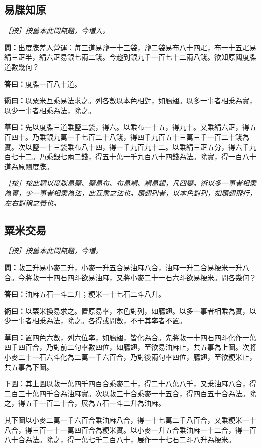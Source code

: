 \documentclass[11pt,a4paper]{article}
\newcommand{\Question}[1]{\par\noindent\textbf{\color{problemcolor}問：}#1\par}
\newcommand{\Answer}[1]{\par\noindent\textbf{\color{answercolor}答曰：}#1\par}
\newcommand{\Method}[1]{\par\noindent\textbf{\color{methodcolor}術曰：}#1\par}
\newcommand{\Working}[1]{\par\noindent\textbf{草曰：}#1\par}
\newcommand{\EditorialNote}[1]{\par\noindent\textit{［按］#1}\par}
\begin{document}
\subsection*{\color{sectioncolor}易牒知原}

\EditorialNote{按舊本此問無題，今増入。}

\Question{出度牒差人營運：毎三道易鹽一十三袋，鹽二袋易布八十四疋，布一十五疋易絹三疋半，絹六疋易銀七兩二錢。今趂到銀九千一百七十二兩八錢。欲知原闗度牒道數幾何？}

\Answer{度牒一百八十道。}

\Method{以粟米互乘易法求之。列各數以本色相對，如鴈翅。以多一事者相乗為實，以少一事者相乘為法，除之。}

\Working{先以度牒三道乗鹽二袋，得六。以乘布一十五，得九十。又乗絹六疋，得五百四十。乃乗銀九萬一千七百二十八錢，得四千九百五十三萬三千一百二十錢為實。次以鹽一十三袋乗布八十四，得一千九百九十二。以乗絹三疋五分，得六千九百七十二。乃乘銀七兩二錢，得五十萬一千九百八十四錢為法。除實，得一百八十道為原闗度牒。}

\EditorialNote{按此題以度牒易鹽、鹽易布、布易絹、絹易銀，凡四變。術以多一事者相乗為實，少一事者相乗為法，此互乘之法也。鴈翅列者，以本色對列，如鴈翅飛行，左右對稱之義也。}

\subsection*{\color{sectioncolor}粟米交易}

\EditorialNote{按舊本此問無題，今増。}

\Question{菽三升易小麥二升，小麥一升五合易油麻八合，油麻一升二合易粳米一升八合。今將菽一十四石四斗欲易油麻，又將小麥二十一石六斗欲易粳米。問各幾何？}

\Answer{油麻五石一斗二升；粳米一十七石二斗八升。}

\Method{以粟米換易求之。置原易率，本色對列，如鴈翅。以多一事者相乘為實，以少一事者相乗為法，除之。各得或問數，不干其率者不置。}

\Working{置四色六數，列六位率，如鴈翅，皆化為合。先將菽一十四石四斗化作一萬四千四百合，乃對前二句率數四位，如鴈翅，至欲易油麻止，共五事為上圖。次將小麥二十一石六斗化為二萬一千六百合，乃對後兩句率四位，鴈翅，至欲粳米止，共五事為下圖。

下圖：其上圖以菽一萬四千四百合乘麥二十，得二十八萬八千，又乗油麻八合，得二百三十萬四千合為油麻實。次以菽三十合乘麥一十五合，得四百五十合為法。除之，得五千一百二十合，展為五石一斗二升為油麻。

其下圖以小麥二萬一千六百合乗油麻八合，得一十七萬二千八百合，又乗粳米一十八合，得三百一十一萬四百合為粳米實。以小麥一升五合乗油麻一十二合，得一百八十合為法。除之，得一萬七千二百八十，展作一十七石二斗八升為粳米。}
\end{document}
